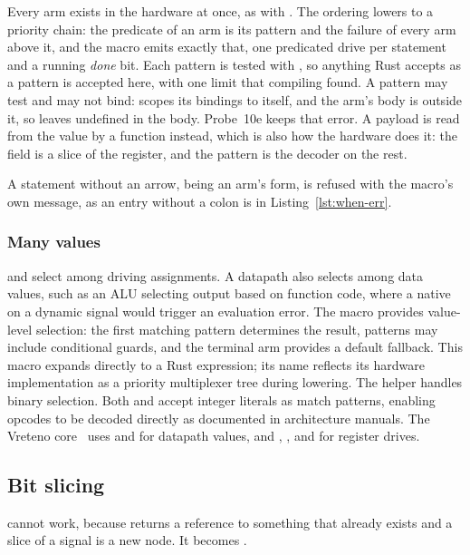 Every arm exists in the hardware at once, as with . The
ordering lowers to a priority chain: the predicate of an arm is its
pattern and the failure of every arm above it, and the macro emits
exactly that, one predicated drive per statement and a running
\emph{done} bit. Each pattern is tested with , so
anything Rust accepts as a pattern is accepted here, with one limit that
compiling found. A pattern may test and may not bind: 
scopes its bindings to itself, and the arm's body is outside it, so
 leaves  undefined in the body. Probe~10e
keeps that error. A payload is read from the value by a function
instead, which is also how the hardware does it: the field is a slice of
the register, and the pattern is the decoder on the rest.

A statement without an arrow,  being an
arm's form, is refused with the macro's own message, as an entry
without a colon is in Listing~\ref{lst:when-err}.

\subsubsection{Many values}
\label{sec:e-select}

 and  select among driving assignments. A datapath also
selects among data values, such as an ALU selecting output based on function
code, where a native  on a dynamic signal would trigger an evaluation
error. The  macro provides value-level selection: the first matching
pattern determines the result, patterns may include conditional guards, and the
terminal arm provides a default fallback. This macro expands directly to a Rust
 expression; its name reflects its hardware implementation as a
priority multiplexer tree during lowering. The  helper handles binary
selection. Both  and  accept integer literals as match
patterns, enabling opcodes to be decoded directly as documented in architecture
manuals. The Vreteno core~\cite{vreteno} uses  and  for
datapath values, and , , and  for register
drives.

\subsection{Bit slicing}

 cannot work, because  returns a reference to
something that already exists and a slice of a signal is a new node. It
becomes .

